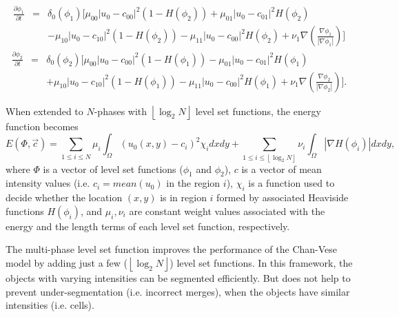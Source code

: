 \begin{eqnarray}
\frac{\partial \phi_1}{\partial t}  & = &  \delta_0(\phi_1) [\mu_{00}|u_0 - c_{00}|^2(1-H(\phi_2)) + \mu_{01}|u_0 - c_{01}|^2H(\phi_2) \\
\nonumber
 & & - \mu_{10}|u_0 - c_{10}|^2(1-H(\phi_2)) - \mu_{11}|u_0 - c_{00}|^2H(\phi_2) +\nu_1\nabla(\frac{\nabla\phi_1}{|\nabla\phi_1|})]
\end{eqnarray}
\begin{eqnarray}
\frac{\partial \phi_2}{\partial t}  & = &  \delta_0(\phi_2) [\mu_{00}|u_0 - c_{00}|^2(1-H(\phi_1)) - \mu_{01}|u_0 - c_{01}|^2H(\phi_1) \\
\nonumber
 & & + \mu_{10}|u_0 - c_{10}|^2(1-H(\phi_1)) - \mu_{11}|u_0 - c_{00}|^2H(\phi_1) +\nu_1\nabla(\frac{\nabla\phi_2}{|\nabla\phi_2|})].
\end{eqnarray}

When extended to $N$-phases with $\left \lfloor \log_2N \right \rfloor$ level set functions, the energy function becomes
\begin{equation}
E(\Phi, \vec{c}) = \sum_{1\le i \le N} \mu_i\int_{\Omega}(u_0(x,y) - c_i)^2\chi_idxdy + \sum_{1 \le i \le \left \lfloor \log_2N \right \rfloor}\nu_i\int_{\Omega}|\nabla H(\phi_i)|dxdy,
\end{equation}
where $\Phi$ is a vector of level set functions ($\phi_1$ and $\phi_2$), $c$ is a vector of mean intensity values (i.e. $c_i = mean(u_0)$ in the region $i$), $\chi_i$ is a function used to decide whether the location $(x,y)$ is in region $i$ formed by associated Heaviside functions $H(\phi_i)$, and $\mu_i, \nu_i$ are constant weight values associated with the energy and the length terms of each level set function, respectively. 

The multi-phase level set function improves the performance of the Chan-Vese model by adding just a few ($\left \lfloor \log_2N \right \rfloor$) level set functions. In this framework, the objects with varying intensities can be segmented efficiently. But does not help to prevent under-segmentation (i.e. incorrect merges), when the objects have similar intensities (i.e. cells).

